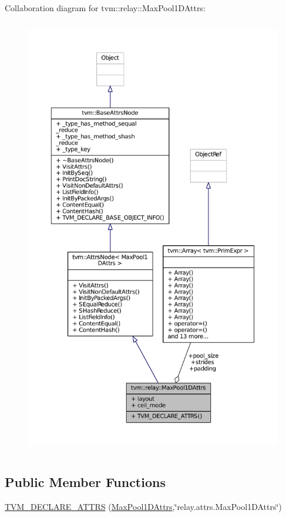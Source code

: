 Collaboration diagram for tvm\+:\+:relay\+:\+:Max\+Pool1\+D\+Attrs\+:
\nopagebreak
\begin{figure}[H]
\begin{center}
\leavevmode
\includegraphics[height=550pt]{structtvm_1_1relay_1_1MaxPool1DAttrs__coll__graph}
\end{center}
\end{figure}
\subsection*{Public Member Functions}
\begin{DoxyCompactItemize}
\item 
\hyperlink{structtvm_1_1relay_1_1MaxPool1DAttrs_a581d4d6d24a1636e9cea4114ff30f695}{T\+V\+M\+\_\+\+D\+E\+C\+L\+A\+R\+E\+\_\+\+A\+T\+T\+RS} (\hyperlink{structtvm_1_1relay_1_1MaxPool1DAttrs}{Max\+Pool1\+D\+Attrs},\char`\"{}relay.\+attrs.\+Max\+Pool1\+D\+Attrs\char`\"{})
\end{DoxyCompactItemize}
